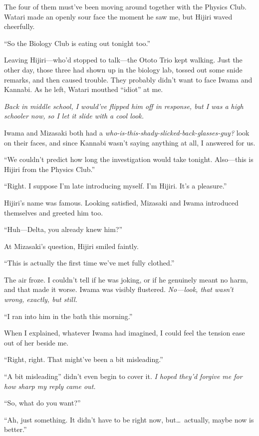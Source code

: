 \documentclass[
    a4paper,
    12pt,
    twoside,
    openany,
    UTF8,
    fontset=windows
]{ctexbook}
\begin{document}
The four of them must've been moving around together with the Physics Club. Watari made an openly sour face the moment he saw me, but Hijiri waved cheerfully.

``So the Biology Club is eating out tonight too.''

Leaving Hijiri---who'd stopped to talk---the Ototo Trio kept walking. Just the other day, those three had shown up in the biology lab, tossed out some snide remarks, and then caused trouble. They probably didn't want to face Iwama and Kannabi. As he left, Watari mouthed ``idiot'' at me.

\textit{Back in middle school, I would've flipped him off in response, but I was a high schooler now, so I let it slide with a cool look.}

Iwama and Mizasaki both had a \textit{who-is-this-shady-slicked-back-glasses-guy?} look on their faces, and since Kannabi wasn't saying anything at all, I answered for us.

``We couldn't predict how long the investigation would take tonight. Also---this is Hijiri from the Physics Club.''

``Right. I suppose I'm late introducing myself. I'm Hijiri. It's a pleasure.''

Hijiri's name was famous. Looking satisfied, Mizasaki and Iwama introduced themselves and greeted him too.

``Huh---Delta, you already knew him?''

At Mizasaki's question, Hijiri smiled faintly.

``This is actually the first time we've met fully clothed.''

The air froze. I couldn't tell if he was joking, or if he genuinely meant no harm, and that made it worse. Iwama was visibly flustered. \textit{No---look, that wasn't wrong, exactly, but still.}

``I ran into him in the bath this morning.''

When I explained, whatever Iwama had imagined, I could feel the tension ease out of her beside me.

``Right, right. That might've been a bit misleading.''

``A bit misleading'' didn't even begin to cover it. \textit{I hoped they'd forgive me for how sharp my reply came out.}

``So, what do you want?''

``Ah, just something. It didn't have to be right now, but\dots\ actually, maybe now is better.''
\end{document}

